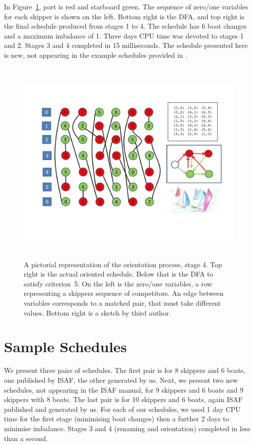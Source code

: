 \documentclass{llncs}
\begin{document}
In Figure~\ref{oriented}, port is red and starboard green. The sequence of zero/one variables for
each skipper is shown on the left. Bottom right is the DFA, and top right is the final schedule
produced from stages 1 to 4. The schedule has 6 boat changes and a maximum imbalance of 1. Three
days CPU time was devoted to stages 1 and 2. Stages 3 and 4 completed in 15 milliseconds. The
schedule presented here is new, not appearing in the example schedules provided in \cite{isaf}.

\begin{figure}[tb]
\centering
\includegraphics[height=10.2cm,width=13.2cm]{oriented.pdf}
\caption{A pictorial representation of the orientation process, stage 4. Top right is the actual
oriented schedule. Below that is the DFA to satisfy criterion~5. On the left is the zero/one
variables, a row representing a skippers sequence of competitors. An edge between variables
corresponds to a matched pair, that must take different values. Bottom right is a sketch by third
author.}\label{oriented}
\end{figure}

\section{Sample Schedules}\label{sec:samples}

We present three pairs of schedules. The first pair is for 8 skippers and 6 boats, one published by
ISAF, the other generated by us. Next, we present two new schedules, not appearing in the ISAF
manual, for 9 skippers and 6 boats and 9 skippers with 8 boats. The last pair is for 10 skippers and
6 boats, again ISAF published and generated by us. For each of our schedules, we used 1 day CPU time
for the first stage (minimising boat changes) then a further 2 days to minimise imbalance. Stages 3
and 4 (renaming and orientation) completed in less than a second.
\end{document}
